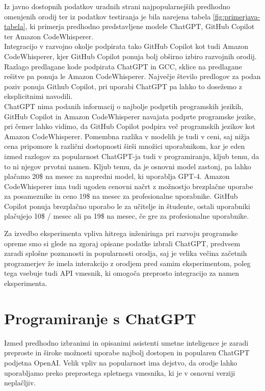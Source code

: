 \documentclass[a4paper,12pt,openright]{book}
\begin{document}
Iz javno dostopnih podatkov uradnih strani najpopularnejših predhodno omenjenih orodij \cite{github_copilot_chat, openai_chatgpt, saasworthy_codewhisperer} ter iz podatkov testiranja je bila narejena tabela \ref{fig:primerjava-tabela}, ki primerja predhodno predstavljene modele ChatGPT, GitHub Copilot ter Amazon CodeWhisperer.  \\
Integracijo v razvojno okolje podpirata tako GitHub Copilot kot tudi Amazon CodeWhisperer, kjer GitHub Copilot ponuja bolj obširno izbiro razvojnih orodij. Razlago predlagane kode podpirata ChatGPT in GCC, sklice na predlagane rešitve pa ponuja le Amazon CodeWhisperer. Največje število predlogov za podan poziv ponuja Github Copilot, pri uporabi ChatGPT pa lahko to dosežemo z eksplicitnimi navodili.\\
ChatGPT nima podanih informacij o najbolje podprtih programskih jezikih, GitHub Copilot in Amazon CodeWhisperer navajata podprte programske jezike, pri čemer lahko vidimo, da GitHub Copilot podpira več programskih jezikov kot Amazon CodeWhisperer. Pomembna razlika v modelih je tudi v ceni, saj nižja cena pripomore k različni dostopnosti širši množici uporabnikom, kar je eden izmed razlogov za popularnost ChatGPT-ja tudi v programiranju, kljub temu, da to ni njegov prvotni namen. Kljub temu, da je osnovni model zastonj, pa lahko plačamo 20\$ na mesec za napredni model, ki uporablja GPT-4. Amazon CodeWhisperer ima tudi ugoden cenovni načrt z možnostjo brezplačne uporabe za posameznike in ceno 19\$ na mesec za profesionalne uporabnike. GitHub Copilot ponuja brezplačno uporabo le za učitelje in študente, ostali uporabniki plačujejo 10\$ / mesec ali pa 19\$ na mesec, če gre za profesionalne uporabnike.
\cite{github_copilot_chat, openai_chatgpt, saasworthy_codewhisperer}

Za izvedbo eksperimenta vpliva hitrega inženiringa pri razvoju programske opreme smo si glede na zgoraj opisane podatke izbrali ChatGPT, predvsem zaradi splošne poznanosti in popularnosti orodja, saj je velika večina začetnih programerjev že imela interakcijo z orodjem pred samim eksperimentom, poleg tega vsebuje tudi API vmesnik, ki omogoča preprosto integracijo za namen eksperimenta.

\section{Programiranje s ChatGPT}
Izmed predhodno izbranimi in opisanimi asistenti umetne inteligence je zaradi preproste in široke možnosti uporabe najbolj dostopen in popularen ChatGPT podjetna OpenAI. Velik vpliv na popularnost ima dejstvo, da orodje lahko uporabljamo preko preprostega spletnega vmesnika, ki je v osnovni verziji neplačljiv.
\end{document}
